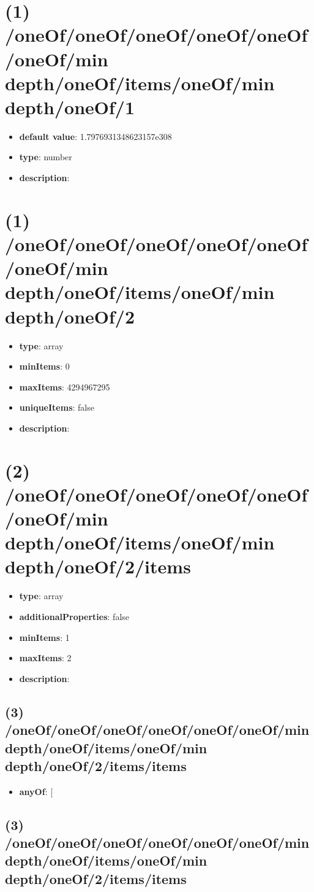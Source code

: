 \section{(1) /oneOf/oneOf/oneOf/oneOf/oneOf/oneOf/min depth/oneOf/items/oneOf/min depth/oneOf/1}
\begin{itemize}[leftmargin=1em]\item {\bf default value}: 1.7976931348623157e308
\item {\bf type}: number
\item {\bf description}: 
\end{itemize}\section{(1) /oneOf/oneOf/oneOf/oneOf/oneOf/oneOf/min depth/oneOf/items/oneOf/min depth/oneOf/2}
\begin{itemize}[leftmargin=1em]\item {\bf type}: array
\item {\bf minItems}: 0
\item {\bf maxItems}: 4294967295
\item {\bf uniqueItems}: false
\item {\bf description}: 
\end{itemize}\section{(2) /oneOf/oneOf/oneOf/oneOf/oneOf/oneOf/min depth/oneOf/items/oneOf/min depth/oneOf/2/items}
\begin{itemize}[leftmargin=2em]\item {\bf type}: array
\item {\bf additionalProperties}: false
\item {\bf minItems}: 1
\item {\bf maxItems}: 2
\item {\bf description}: 
\end{itemize}\subsection{(3) /oneOf/oneOf/oneOf/oneOf/oneOf/oneOf/min depth/oneOf/items/oneOf/min depth/oneOf/2/items/items}
\begin{itemize}[leftmargin=3em]\item {\bf anyOf}: [\end{itemize}\subsection{(3) /oneOf/oneOf/oneOf/oneOf/oneOf/oneOf/min depth/oneOf/items/oneOf/min depth/oneOf/2/items/items}
